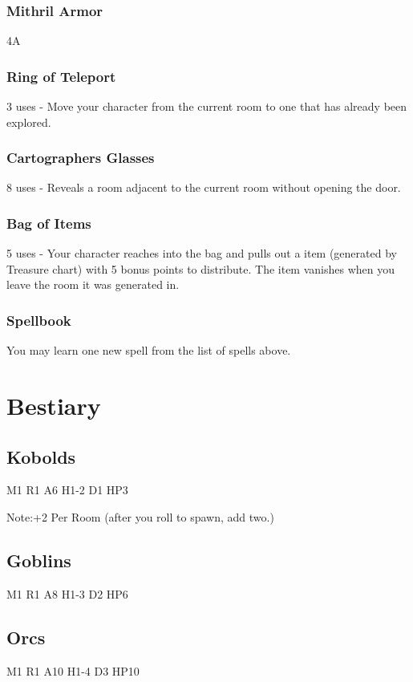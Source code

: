 \documentclass[a6paper,hidelinks]{article}
\begin{document}
\subsubsection{Mithril Armor}
4A

\subsubsection{Ring of Teleport}
3 uses -  Move your character from the current room to one that has already been explored.

\subsubsection{Cartographers Glasses}
8 uses - Reveals a room adjacent to the current room without opening the door.

\subsubsection{Bag of Items}
5 uses - Your character reaches into the bag and pulls out a item (generated by Treasure chart) with 5 bonus points to distribute. The item vanishes when you leave the room it was generated in.

\subsubsection{Spellbook}
You may learn one new spell from the list of spells above.

\section{Bestiary}

\subsection{Kobolds}
M1 R1 A6 H1-2 D1 HP3

Note:+2 Per Room (after you roll to spawn, add two.)

\subsection{Goblins}

M1 R1 A8 H1-3 D2 HP6

\subsection{Orcs}
M1 R1 A10 H1-4 D3 HP10
\end{document}
